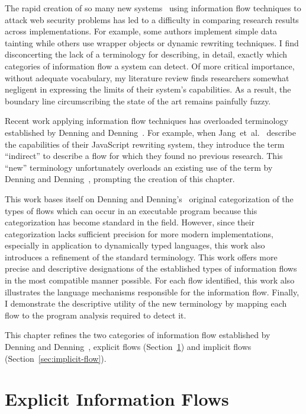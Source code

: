 The rapid creation of so many new systems~\cite{chugh.etal+09, yaowen.etal+04, jang.etal+10, robertson.vigna+09, vogt.etal+07} using information flow techniques to attack web security problems has led to a difficulty in comparing research results across implementations.
For example, some authors implement simple data tainting while others use wrapper objects or dynamic rewriting techniques.
I find disconcerting the lack of a terminology for describing, in detail, exactly which categories of information flow a system can detect.
Of more critical importance, without adequate vocabulary, my literature review finds researchers somewhat negligent in expressing the limits of their system's capabilities.
As a result, the boundary line circumscribing the state of the art remains painfully fuzzy.

Recent work applying information flow techniques has overloaded terminology established by Denning and Denning~\cite{denning.denning+77}.
For example, when Jang~et~al.~\cite{jang.etal+10} describe the capabilities of their JavaScript rewriting system, they introduce the term ``indirect'' to describe a flow for which they found no previous research.
This ``new'' terminology unfortunately overloads an existing use of the term by Denning and Denning~\cite{denning.denning+77}, prompting the creation of this chapter.

This work bases itself on Denning and Denning's~\cite{denning.denning+77} original categorization of the types of flows which can occur in an executable program because this categorization has become standard in the field.
However, since their categorization lacks sufficient precision for more modern implementations, especially in application to dynamically typed languages, this work also introduces a refinement of the standard terminology.
This work offers more precise and descriptive designations of the established types of information flows in the most compatible manner possible.
For each flow identified, this work also illustrates the language mechanisms responsible for the information flow.
Finally, I demonstrate the descriptive utility of the new terminology by mapping each flow to the program analysis required to detect it.

This chapter refines the two categories of information flow established by Denning and Denning~\cite{denning.denning+77}, explicit flows (Section~\ref{sec:explicit-flow}) and implicit flows (Section~\ref{sec:implicit-flow}).

\section{Explicit Information Flows}
\label{sec:explicit-flow}


